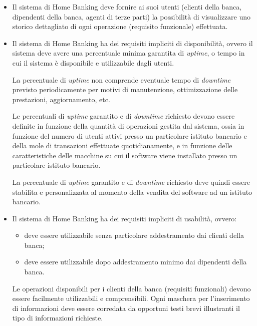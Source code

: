 \begin{itemize}
	\item Il sistema di Home Banking deve fornire ai suoi utenti (clienti della banca, dipendenti della banca, agenti di terze parti) la possibilit\`a di visualizzare uno storico dettagliato di ogni operazione (requisito funzionale) effettuata.

	\item Il sistema di Home Banking ha dei requisiti impliciti di disponibilit\`a, ovvero il sistema deve avere una percentuale minima garantita di \emph{uptime}, o tempo in cui il sistema \`e disponibile e utilizzabile dagli utenti.

	La percentuale di \emph{uptime} non comprende eventuale tempo di \emph{downtime} previsto periodicamente per motivi di manutenzione, ottimizzazione delle prestazioni, aggiornamento, etc.

	Le percentuali di \emph{uptime} garantito e di \emph{downtime} richiesto devono essere definite in funzione della quantit\`a di operazioni gestita dal sistema, ossia in funzione del numero di utenti attivi presso un particolare istituto bancario e della mole di transazioni effettuate quotidianamente, e in funzione delle caratteristiche delle macchine su cui il software viene installato presso un particolare istituto bancario.

	La percentuale di \emph{uptime} garantito e di \emph{downtime} richiesto deve quindi essere stabilita e personalizzata al momento della vendita del software ad un istituto bancario.

	\item Il sistema di Home Banking ha dei requisiti impliciti di usabilit\`a, ovvero:
	\begin{itemize}
		\item deve essere utilizzabile senza particolare addestramento dai clienti della banca;
		\item deve essere utilizzabile dopo addestramento minimo dai dipendenti della banca.
	\end{itemize}
	Le operazioni disponibili per i clienti della banca (requisiti funzionali) devono essere facilmente utilizzabili e comprensibili.
	Ogni maschera per l'inserimento di informazioni deve essere corredata da opportuni testi brevi illustranti il tipo di informazioni richieste.
\end{itemize}

